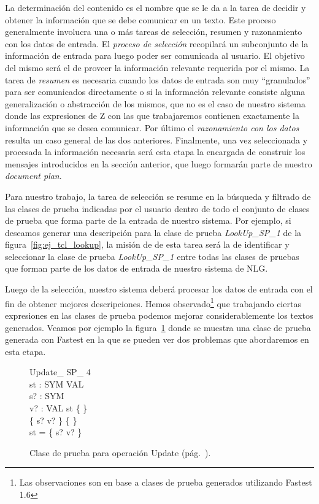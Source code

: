 La determinación del contenido es el nombre que se le da a la tarea de decidir y obtener la información que se debe comunicar en un texto. Este proceso generalmente involucra una o más tareas de selección, resumen y razonamiento con los datos de entrada.
El \emph{proceso de selección} recopilará un subconjunto de la información de entrada para luego poder ser comunicada al usuario. El objetivo del mismo será el de proveer la información relevante requerida por el mismo.
La tarea de \emph{resumen} es necesaria cuando los datos de entrada son muy ``granulados'' para ser comunicados directamente o si la información relevante consiste alguna generalización o abstracción de los mismos, que no es el caso de nuestro sistema donde las expresiones de Z con las que trabajaremos contienen exactamente la información que se desea comunicar.
Por último el \emph{razonamiento con los datos} resulta un caso general de las dos anteriores. Finalmente, una vez seleccionada y procesada la información necesaria será esta etapa la encargada de construir los mensajes introducidos en la sección anterior, que luego formarán parte de nuestro \emph{document plan}.

Para nuestro trabajo, la tarea de selección se resume en la búsqueda y filtrado de las clases de prueba indicadas por el usuario dentro de todo el conjunto de clases de prueba que forma parte de la entrada de nuestro sistema. Por ejemplo, si deseamos generar una descripción para la clase de prueba \emph{LookUp\_SP\_1} de la figura~\ref{fig:ej_tcl_lookup}, la misión de de esta tarea será la de identificar y seleccionar la clase de prueba \emph{LookUp\_SP\_1} entre todas las clases de pruebas que forman parte de los datos de entrada de nuestro sistema de NLG.

Luego de la selección, nuestro sistema deberá procesar los datos de entrada con el fin de obtener mejores descripciones. Hemos observado\footnote{Las observaciones son en base a clases de prueba generados utilizando Fastest 1.6} que trabajando ciertas expresiones en las clases de prueba podemos mejorar considerablemente los textos generados. Veamos por ejemplo la figura~\ref{fig:ej_update_sp_4} donde se muestra una clase de prueba generada con Fastest en la que se pueden ver dos problemas que abordaremos en esta etapa.

\begin{figure}[H]
  \centering
  \begin{schema}{Update\_ SP\_ 4}\\
   st : SYM \pfun VAL \\
   s? : SYM \\
   v? : VAL 
  \where
   st \neq \{ \} \\
   \{ s? \mapsto v? \} \neq \{ \} \\
   \dom st = \dom \{ s? \mapsto v? \}
  \end{schema}
  \caption{Clase de prueba para operación Update (pág.~\pageref{fig:spec_symbol_table}).}
  \label{fig:ej_update_sp_4}
\end{figure}


